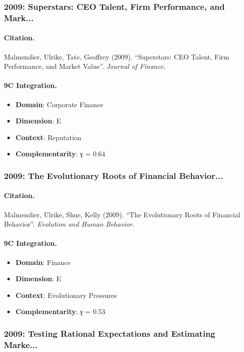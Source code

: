 \subsubsection{2009: Superstars: CEO Talent, Firm Performance, and Mark...}

\paragraph{Citation.}
Malmendier, Ulrike, Tate, Geoffrey (2009). ``Superstars: CEO Talent, Firm Performance, and Market Value''. \textit{Journal of Finance}.

\paragraph{9C Integration.}
\begin{itemize}[nosep]
  \item \textbf{Domain}: Corporate Finance
  \item \textbf{Dimension}: E
  \item \textbf{Context}: Reputation
  \item \textbf{Complementarity}: γ = 0.64
\end{itemize}


\subsubsection{2009: The Evolutionary Roots of Financial Behavior...}

\paragraph{Citation.}
Malmendier, Ulrike, Shue, Kelly (2009). ``The Evolutionary Roots of Financial Behavior''. \textit{Evolution and Human Behavior}.

\paragraph{9C Integration.}
\begin{itemize}[nosep]
  \item \textbf{Domain}: Finance
  \item \textbf{Dimension}: E
  \item \textbf{Context}: Evolutionary Pressures
  \item \textbf{Complementarity}: γ = 0.53
\end{itemize}


\subsubsection{2009: Testing Rational Expectations and Estimating Marke...}

